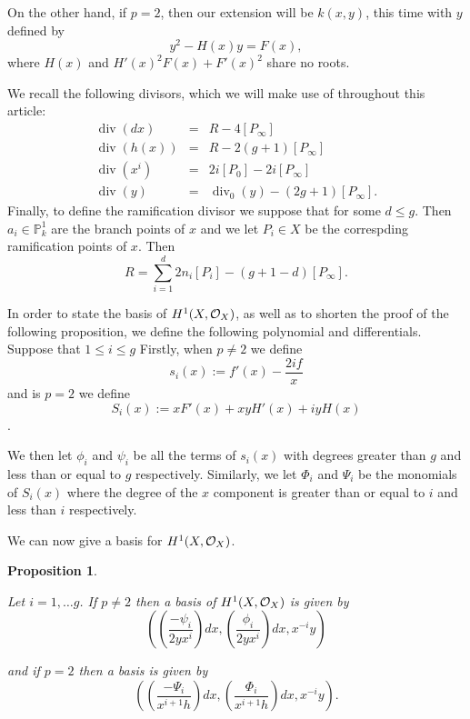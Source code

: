 \documentclass[draft, 11pt]{article} %
\theoremstyle{plain}
\newtheorem{prop}[defn]{Proposition}
\theoremstyle{remark}
\newcommand{\cO}{{\cal O}}
\DeclareMathOperator{\di}{div}
\begin{document}
On the other hand, if $p=2$, then our extension will be $k(x,y)$, this time with $y$ defined by
\[
	y^2 - H(x)y = F(x),
\]
where $H(x)$ and $H'(x)^2F(x) + F'(x)^2$ share no roots.

We recall the following divisors, which we will make use of throughout this article:
\begin{eqnarray*}
\di (dx) & = & R - 4[P_\infty] \\
\di (h(x)) & = & R - 2(g+1)[P_\infty] \\
\di (x^i) & = & 2i[P_0] - 2i[P_\infty]\\
\di (y) & = & \di_0(y) - (2g+1)[P_\infty].
\end{eqnarray*}
Finally, to define the ramification divisor we suppose that  for some $d \leq g$.
Then $a_i \in \mathbb P_k^1$ are the branch points of $x$ and we let $P_i \in X$ be the correspding ramification points of $x$.
Then 
\[
R = \sum_{i=1}^d 2n_i[P_i] - (g+1-d)[P_\infty].
\]


In order to state the basis of $H^1(X,\cO_X)$, as well as to shorten the proof of the following proposition, we define the following polynomial and differentials.
Suppose that $1 \leq i \leq g$
Firstly, when $p\neq 2$ we define 
\[
	s_i(x) := f'(x) - \frac{2if}{x}
\]
and is $p = 2$ we define
\[
	S_i(x) := xF'(x) + xyH'(x) + iyH(x)
\].

We then let $\phi_i$ and $\psi_i$ be all the terms of $s_i(x)$ with degrees greater than $g$ and less than or equal to $g$ respectively.
Similarly, we let $\Phi_i$ and $\Psi_i$ be the monomials of $S_i(x)$ where the degree of the $x$ component is greater than or equal to $i$ and less than $i$ respectively.

We can now give a basis for $H^1(X,\cO_X)$.

\begin{prop}\label{basis}

Let $i=1,\ldots g$. If $p\neq 2$ then a basis of $H^1(X,\cO_X)$ is given by 
\[
	\left( \left( \frac{-\psi_i}{2yx^i}\right) dx, \left(\frac{\phi_i}{2yx^i}\right) dx, x^{-i}y\right)
\]

and if $p=2$ then a basis is given by
\[
	\left( \left(\frac{-\Psi_i}{x^{i+1}h}\right) dx, \left( \frac{\Phi_i}{x^{i+1}h} \right) dx, x^{-i}y \right).
\]
\end{prop}
\end{document}
